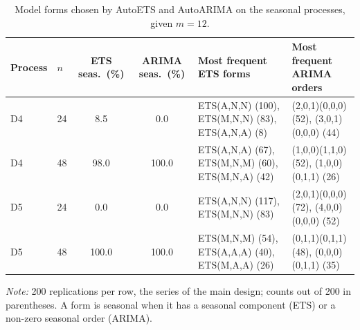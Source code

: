 \documentclass[ASNA]{USG}
\begin{document}
\begin{table}[!htbp]
\centering
\begin{threeparttable}
\caption{Model forms chosen by AutoETS and AutoARIMA on the seasonal processes, given $m = 12$.}
\label{tab:si-forms}
\scriptsize\setlength{\tabcolsep}{4pt}
\begin{tabular}{llccp{4.3cm}p{4.3cm}}
\toprule
Process & $n$ & ETS seas.\ (\%) & ARIMA seas.\ (\%) & Most frequent ETS forms & Most frequent ARIMA orders \\
\midrule
D4 & 24 & 8.5 & 0.0 & ETS(A,N,N) (100), ETS(M,N,N) (83), ETS(A,N,A) (8) & (2,0,1)(0,0,0) (52), (3,0,1)(0,0,0) (44) \\
D4 & 48 & 98.0 & 100.0 & ETS(A,N,A) (67), ETS(M,N,M) (60), ETS(M,N,A) (42) & (1,0,0)(1,1,0) (52), (1,0,0)(0,1,1) (26) \\
D5 & 24 & 0.0 & 0.0 & ETS(A,N,N) (117), ETS(M,N,N) (83) & (2,0,1)(0,0,0) (72), (4,0,0)(0,0,0) (52) \\
D5 & 48 & 100.0 & 100.0 & ETS(M,N,M) (54), ETS(A,A,A) (40), ETS(M,A,A) (26) & (0,1,1)(0,1,1) (48), (0,0,0)(0,1,1) (35) \\
\bottomrule
\end{tabular}
\begin{tablenotes}[flushleft]\footnotesize
\item \textit{Note:} 200 replications per row, the series of the main design; counts out of 200 in parentheses. A form is seasonal when it has a seasonal component (ETS) or a non-zero seasonal order (ARIMA).
\end{tablenotes}
\end{threeparttable}
\end{table}
\end{document}
